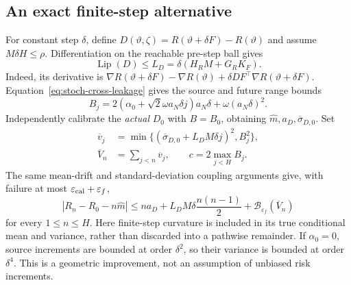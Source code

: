\subsection{An exact finite-step alternative}
For constant step $\delta$, define $D(\vartheta,\zeta)=R(\vartheta+\delta F)-R(\vartheta)$ and assume $M\delta H\le\rho$. Differentiation on the reachable pre-step ball gives
\begin{equation}
 \operatorname{Lip}(D)\le L_D=\delta(H_RM+G_RK_F).
\end{equation}
Indeed, its derivative is $\nabla R(\vartheta+\delta F)-\nabla R(\vartheta)+\delta DF^\top\nabla R(\vartheta+\delta F)$. Equation~\eqref{eq:stoch-cross-leakage} gives the source and future range bounds
\begin{equation}
 B_j=2(\alpha_0+\sqrt2\omega a_N\delta j)a_N\delta
          +\omega(a_N\delta)^2.
\end{equation}
Independently calibrate the \emph{actual} $D_0$ with $B=B_0$, obtaining $\widehat m,a_D,\overline\sigma_{D,0}$. Set
\begin{align}
 \overline v_j&=\min\{(\overline\sigma_{D,0}+L_DM\delta j)^2,B_j^2\},\\
 \overline V_n&=\sum_{j<n}\overline v_j,\qquad c=2\max_{j<H}B_j.
\end{align}
The same mean-drift and standard-deviation coupling arguments give, with failure at most $\varepsilon_{\rm cal}+\varepsilon_f$,
\begin{equation}
 |R_n-R_0-n\widehat m|
 \le n a_D+L_DM\delta\frac{n(n-1)}2
           +\mathcal B_{\varepsilon_f}(\overline V_n)
 \label{eq:stoch-exact-step-envelope}
\end{equation}
for every $1\le n\le H$. Here finite-step curvature is included in its true conditional mean and variance, rather than discarded into a pathwise remainder. If $\alpha_0=0$, source increments are bounded at order $\delta^2$, so their variance is bounded at order $\delta^4$. This is a geometric improvement, not an assumption of unbiased risk increments.

